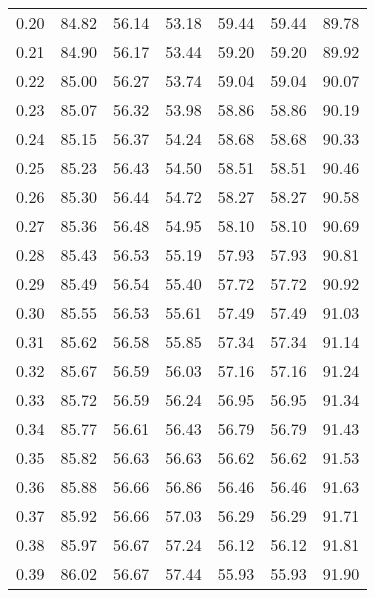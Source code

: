 \begin{tabular}{|c|c|c|c|c|c|c|}
      0.20 &     84.82 &     56.14 &      53.18 &   59.44 &      59.44 &         89.78 \\
      0.21 &     84.90 &     56.17 &      53.44 &   59.20 &      59.20 &         89.92 \\
      0.22 &     85.00 &     56.27 &      53.74 &   59.04 &      59.04 &         90.07 \\
      0.23 &     85.07 &     56.32 &      53.98 &   58.86 &      58.86 &         90.19 \\
      0.24 &     85.15 &     56.37 &      54.24 &   58.68 &      58.68 &         90.33 \\
      0.25 &     85.23 &     56.43 &      54.50 &   58.51 &      58.51 &         90.46 \\
      0.26 &     85.30 &     56.44 &      54.72 &   58.27 &      58.27 &         90.58 \\
      0.27 &     85.36 &     56.48 &      54.95 &   58.10 &      58.10 &         90.69 \\
      0.28 &     85.43 &     56.53 &      55.19 &   57.93 &      57.93 &         90.81 \\
      0.29 &     85.49 &     56.54 &      55.40 &   57.72 &      57.72 &         90.92 \\
      0.30 &     85.55 &     56.53 &      55.61 &   57.49 &      57.49 &         91.03 \\
      0.31 &     85.62 &     56.58 &      55.85 &   57.34 &      57.34 &         91.14 \\
      0.32 &     85.67 &     56.59 &      56.03 &   57.16 &      57.16 &         91.24 \\
      0.33 &     85.72 &     56.59 &      56.24 &   56.95 &      56.95 &         91.34 \\
      0.34 &     85.77 &     56.61 &      56.43 &   56.79 &      56.79 &         91.43 \\
      0.35 &     85.82 &     56.63 &      56.63 &   56.62 &      56.62 &         91.53 \\
      0.36 &     85.88 &     56.66 &      56.86 &   56.46 &      56.46 &         91.63 \\
      0.37 &     85.92 &     56.66 &      57.03 &   56.29 &      56.29 &         91.71 \\
      0.38 &     85.97 &     56.67 &      57.24 &   56.12 &      56.12 &         91.81 \\
      0.39 &     86.02 &     56.67 &      57.44 &   55.93 &      55.93 &         91.90 \\

\end{tabular}
